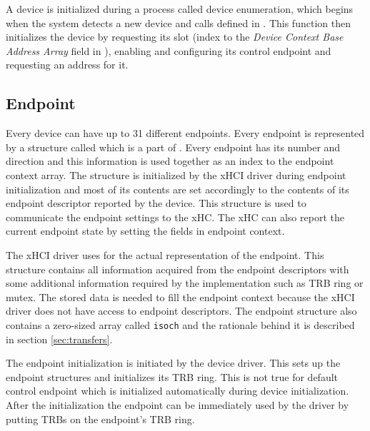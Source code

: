 A device is initialized during a process called device enumeration, which begins when
the system detects a new device and calls  defined in
. This function then initializes the device
by requesting its slot (index to the \textit{Device Context Base Address Array} field in
), enabling and configuring its control endpoint and requesting
an address for it.

\subsection{Endpoint}

Every device can have up to 31 different endpoints. Every endpoint is represented by a structure
called  which is a part of . Every endpoint
has its number and direction and this information is used together as an index to the endpoint
context array. The structure is initialized by the xHCI driver during endpoint initialization
and most of its contents are set accordingly to the contents of its endpoint descriptor reported by the device.
This structure is used to communicate the endpoint settings to the xHC.
The xHC can also report the current endpoint state by setting the fields in endpoint context.

The xHCI driver uses  for the actual representation of the endpoint.
This structure contains all information acquired from the endpoint descriptors with some
additional information required by the implementation such as TRB ring or mutex.
The stored data is needed to fill the endpoint context
because the xHCI driver does not have access to endpoint descriptors.
The endpoint structure also contains a zero-sized array called \texttt{isoch}
and the rationale behind it is described in section \ref{sec:transfers}.

The endpoint initialization is initiated by the device driver. This sets up
the endpoint structures and initializes its TRB ring. This is not true for default
control endpoint which is initialized automatically during device initialization.
After the initialization the endpoint can be immediately used by the driver
by putting TRBs on the endpoint's TRB ring.


